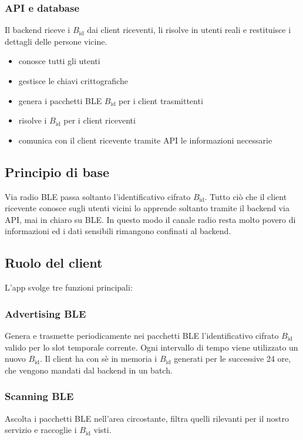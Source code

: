 \documentclass[a4paper,11pt]{article}
\begin{document}
\subsubsection{API e database}
Il backend riceve i \(B_{\text{id}}\) dai client riceventi, li risolve in utenti reali e restituisce i dettagli delle persone vicine.
\begin{itemize}
  \item conosce tutti gli utenti
  \item gestisce le chiavi crittografiche
  \item genera i pacchetti BLE \(B_{\text{id}}\) per i client trasmittenti
  \item risolve i \(B_{\text{id}}\) per i client riceventi
  \item comunica con il client ricevente tramite API le informazioni necessarie
\end{itemize}

\subsection{Principio di base}
Via radio BLE passa soltanto l'identificativo cifrato \(B_{\text{id}}\).
Tutto ciò che il client ricevente conosce sugli utenti vicini lo apprende soltanto tramite il backend via API, mai in chiaro su BLE.
In questo modo il canale radio resta molto povero di informazioni ed i dati sensibili rimangono confinati al backend.

\subsection{Ruolo del client}
L'app svolge tre funzioni principali:

\subsubsection{Advertising BLE}
Genera e trasmette periodicamente nei pacchetti BLE l'identificativo cifrato \(B_{\text{id}}\) valido per lo slot temporale corrente.
Ogni intervallo di tempo viene utilizzato un nuovo \(B_{\text{id}}\). Il client ha con sè in memoria i \(B_{\text{id}}\) generati per le successive
24 ore, che vengono mandati dal backend in un batch.

\subsubsection{Scanning BLE}
Ascolta i pacchetti BLE nell'area circostante, filtra quelli rilevanti per il nostro servizio e raccoglie i \(B_{\text{id}}\) visti.
\end{document}
